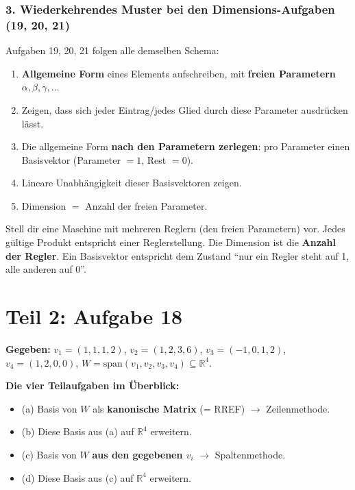 \documentclass[a4paper,12pt]{article}
\begin{document}
\section*{3. Wiederkehrendes Muster bei den Dimensions-Aufgaben (19, 20, 21)}

Aufgaben 19, 20, 21 folgen alle demselben Schema:

\begin{merkbox}[title={Vorgehen bei ``finde Dimension eines Unterraums''}]
\begin{enumerate}[nosep]
    \item \textbf{Allgemeine Form} eines Elements aufschreiben, mit \textbf{freien Parametern} $\alpha, \beta, \gamma, \dots$
    \item Zeigen, dass sich jeder Eintrag/jedes Glied durch diese Parameter ausdr\"ucken l\"asst.
    \item Die allgemeine Form \textbf{nach den Parametern zerlegen}: pro Parameter einen Basisvektor (Parameter $= 1$, Rest $= 0$).
    \item Lineare Unabh\"angigkeit dieser Basisvektoren zeigen.
    \item Dimension $=$ Anzahl der freien Parameter.
\end{enumerate}
\end{merkbox}

\begin{analogie}
Stell dir eine Maschine mit mehreren Reglern (den freien Parametern) vor. Jedes g\"ultige Produkt entspricht einer Reglerstellung. Die Dimension ist die \textbf{Anzahl der Regler}. Ein Basisvektor entspricht dem Zustand ``nur ein Regler steht auf 1, alle anderen auf 0''.
\end{analogie}

\newpage

\part*{Teil 2: Aufgabe 18}

\textbf{Gegeben:} $v_1 = (1,1,1,2)$, $v_2 = (1,2,3,6)$, $v_3 = (-1,0,1,2)$, $v_4 = (1,2,0,0)$, $W = \text{span}(v_1, v_2, v_3, v_4) \subseteq \mathbb{R}^4$.

\medskip

\textbf{Die vier Teilaufgaben im \"Uberblick:}
\begin{itemize}[leftmargin=*, nosep]
\item (a) Basis von $W$ als \textbf{kanonische Matrix} (= RREF) $\to$ Zeilenmethode.
\item (b) Diese Basis aus (a) auf $\mathbb{R}^4$ erweitern.
\item (c) Basis von $W$ \textbf{aus den gegebenen $v_i$} $\to$ Spaltenmethode.
\item (d) Diese Basis aus (c) auf $\mathbb{R}^4$ erweitern.
\end{itemize}
\end{document}
